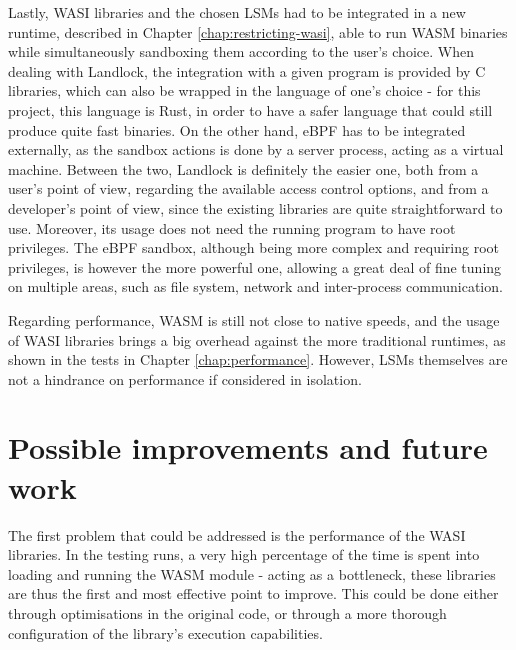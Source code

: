 Lastly, WASI libraries and the chosen LSMs had to be integrated in a new runtime, described in
Chapter \ref{chap:restricting-wasi}, able to run WASM binaries while simultaneously sandboxing them according to the user's choice.
When dealing with Landlock, the integration with a given program is provided by C libraries,
which can also be wrapped in the language of one's choice - for this project, this language is Rust,
in order to have a safer language that could still produce quite fast binaries.
On the other hand, eBPF has to be integrated externally, as the sandbox actions is done by
a server process, acting as a virtual machine.
Between the two, Landlock is definitely the easier one, both from a user's point of view,
regarding the available access control options, and from a developer's point of view, since
the existing libraries are quite straightforward to use. Moreover, its usage does not need the running program
to have root privileges.
The eBPF sandbox, although being more complex and requiring root privileges, is however
the more powerful one, allowing a great deal of fine tuning on multiple areas,
such as file system, network and inter-process communication.

Regarding performance, WASM is still not close to native speeds, and the usage of WASI libraries
brings a big overhead against the more traditional runtimes, as shown in the tests in Chapter \ref{chap:performance}.
However, LSMs themselves are not a hindrance on performance if considered in isolation.

\section{Possible improvements and future work}

The first problem that could be addressed is the performance of the WASI libraries.
In the testing runs, a very high percentage of the time is spent into loading and running the WASM module -
acting as a bottleneck, these libraries are thus the first and most effective point to improve.
This could be done either through optimisations in the original code, or through a more thorough
configuration of the library's execution capabilities.

